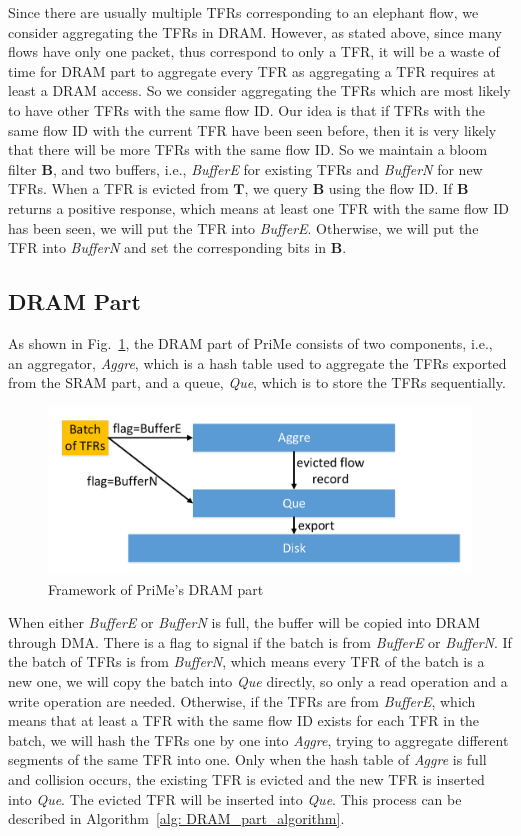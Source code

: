 \documentclass[10pt, conference, letterpaper]{IEEEtran}
\begin{document}
Since there are usually multiple TFRs corresponding to an elephant flow, we consider aggregating the TFRs in DRAM. However, as stated above, since many flows have only one packet, thus correspond to only a TFR, it will be a waste of time for DRAM part to aggregate every TFR as aggregating a TFR requires at least a DRAM access. So we consider aggregating the TFRs which are most likely to have other TFRs with the same flow ID. Our idea is that if TFRs with the same flow ID with the current TFR have been seen before, then it is very likely that there will be more TFRs with the same flow ID. So we maintain a bloom filter $\mathbf{B}$, and two buffers, i.e., \emph{BufferE} for existing TFRs and \emph{BufferN} for new TFRs. When a TFR is evicted from $\mathbf{T}$, we query $\mathbf{B}$ using the flow ID. If $\mathbf{B}$ returns a positive response, which means at least one TFR with the same flow ID has been seen, we will put the TFR into \emph{BufferE}. Otherwise, we will put the TFR into \emph{BufferN} and set the corresponding bits in $\mathbf{B}$.

\subsection{DRAM Part}
As shown in Fig.~\ref{fig:drampart}, the DRAM part of PriMe consists of two components, i.e., an aggregator, \emph{Aggre}, which is a hash table used to aggregate the TFRs exported from the SRAM part, and a queue, \emph{Que}, which is to store the TFRs sequentially.

\begin{figure}[ht!]
	\centering
	\includegraphics[width=\linewidth]{figures/framework/DRAM_part}
	\caption{Framework of PriMe's DRAM part}
	\label{fig:drampart}
\end{figure}

When either \emph{BufferE} or \emph{BufferN} is full, the buffer will be copied into DRAM through DMA. There is a flag to signal if the batch is from \emph{BufferE} or \emph{BufferN}. If the batch of TFRs is from \emph{BufferN}, which means every TFR of the batch is a new one, we will copy the batch into \emph{Que} directly, so only a read operation and a write operation are needed. Otherwise, if the TFRs are from \emph{BufferE}, which means that at least a TFR with the same flow ID exists for each TFR in the batch, we will hash the TFRs one by one into \emph{Aggre}, trying to aggregate different segments of the same TFR into one. Only when the hash table of \emph{Aggre} is full and collision occurs, the existing TFR is evicted and the new TFR is inserted into \emph{Que}. The evicted TFR will be inserted into \emph{Que}. This process can be described in Algorithm~\ref{alg: DRAM_part_algorithm}.
\end{document}
